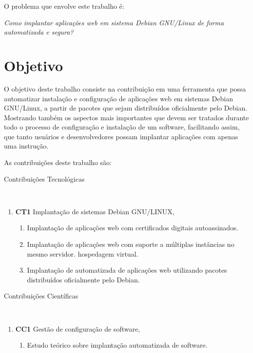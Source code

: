 O problema que envolve este trabalho é:

\begin{center}
  \textit{
  Como implantar aplicações web em sistema Debian GNU/Linux de forma automatizada
  e segura?
}
\end{center}

\section{Objetivo}

O objetivo deste trabalho consiste na contribuição em uma ferramenta
que possa automatizar instalação e configuração de aplicações web em sistemas
Debian GNU/Linux, a partir de pacotes que sejam distribuídos oficialmente pelo
Debian. Mostrando também os aspectos mais importantes que devem ser tratados durante
todo o processo de configuração e instalação de um software, facilitando assim, que
tanto usuários e desenvolvedores possam implantar aplicações com apenas uma
instrução.

As contribuições deste trabalho são:

\begin{description}
  \item [Contribuições Tecnológicas]\
\end{description}
    \begin{enumerate}
      \item \textbf{CT1} Implantação de sistemas Debian GNU/LINUX,
        \begin{enumerate}
          \item Implantação de aplicações web com certificados digitais autoassinados.
          \item Implantação de aplicações web com suporte a múltiplas instâncias no mesmo servidor.
          hospedagem virtual.
          \item Implantação de automatizada de aplicações web utilizando pacotes
          distribuídos oficialmente pelo Debian.
        \end{enumerate}
    \end{enumerate}

\begin{description}
  \item [Contribuições Científicas]\
\end{description}
    \begin{enumerate}
      \item \textbf{CC1} Gestão de configuração de software,
        \begin{enumerate}
          \item Estudo teórico sobre implantação automatizada de software.
        \end{enumerate}
    \end{enumerate}


